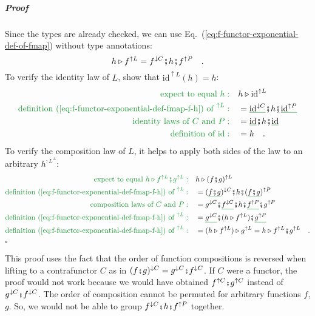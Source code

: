 \subparagraph{Proof}

Since the types are already checked, we can use Eq.~(\ref{eq:f-functor-exponential-def-of-fmap})
without type annotations:
\begin{equation}
h\triangleright f^{\uparrow L}=f^{\downarrow C}\bef h\bef f^{\uparrow P}\quad.\label{eq:f-functor-exponential-def-fmap-f-h}
\end{equation}
To verify the identity law of $L$, show that $\text{id}^{\uparrow L}(h)=h$:
\begin{align*}
{\color{greenunder}\text{expect to equal }h:}\quad & h\triangleright\text{id}^{\uparrow L}\\
{\color{greenunder}\text{definition (\ref{eq:f-functor-exponential-def-fmap-f-h}) of }^{\uparrow L}:}\quad & =\gunderline{\text{id}^{\downarrow C}}\bef h\bef\gunderline{\text{id}^{\uparrow P}}\\
{\color{greenunder}\text{identity laws of }C\text{ and }P:}\quad & =\gunderline{\text{id}}\bef h\bef\gunderline{\text{id}}\\
{\color{greenunder}\text{definition of }\text{id}:}\quad & =h\quad.
\end{align*}
To verify the composition law of $L$, it helps to apply both sides
of the law to an arbitrary $h^{:L^{A}}$:
\begin{align*}
{\color{greenunder}\text{expect to equal }h\triangleright f^{\uparrow L}\bef g^{\uparrow L}:}\quad & h\triangleright(f\bef g)^{\uparrow L}\\
{\color{greenunder}\text{definition (\ref{eq:f-functor-exponential-def-fmap-f-h}) of }^{\uparrow L}:}\quad & =(\gunderline{f\bef g})^{\downarrow C}\bef h\bef(\gunderline{f\bef g})^{\uparrow P}\\
{\color{greenunder}\text{composition laws of }C\text{ and }P:}\quad & =g^{\downarrow C}\bef\gunderline{f^{\downarrow C}}\bef h\bef\gunderline{f^{\uparrow P}}\bef g^{\uparrow P}\\
{\color{greenunder}\text{definition (\ref{eq:f-functor-exponential-def-fmap-f-h}) of }^{\uparrow L}:}\quad & =\gunderline{g^{\downarrow C}}\bef(h\triangleright f^{\uparrow L})\bef\gunderline{g^{\uparrow P}}\\
{\color{greenunder}\text{definition (\ref{eq:f-functor-exponential-def-fmap-f-h}) of }^{\uparrow L}:}\quad & =(h\triangleright f^{\uparrow L})\triangleright g^{\uparrow L}=h\triangleright f^{\uparrow L}\bef g^{\uparrow L}\quad.
\end{align*}
$\square$

This proof uses the fact that the order of function compositions is
reversed when lifting to a contrafunctor $C$ as in $(f\bef g)^{\downarrow C}=g^{\downarrow C}\bef f^{\downarrow C}$.
If $C$ were a functor, the proof would not work because we would
have obtained $f^{\uparrow C}\bef g^{\uparrow C}$ instead of $g^{\downarrow C}\bef f^{\downarrow C}$.
The order of composition cannot be permuted for arbitrary functions
$f$, $g$. So, we would not be able to group $f^{\downarrow C}\bef h\bef f^{\uparrow P}$
together.

